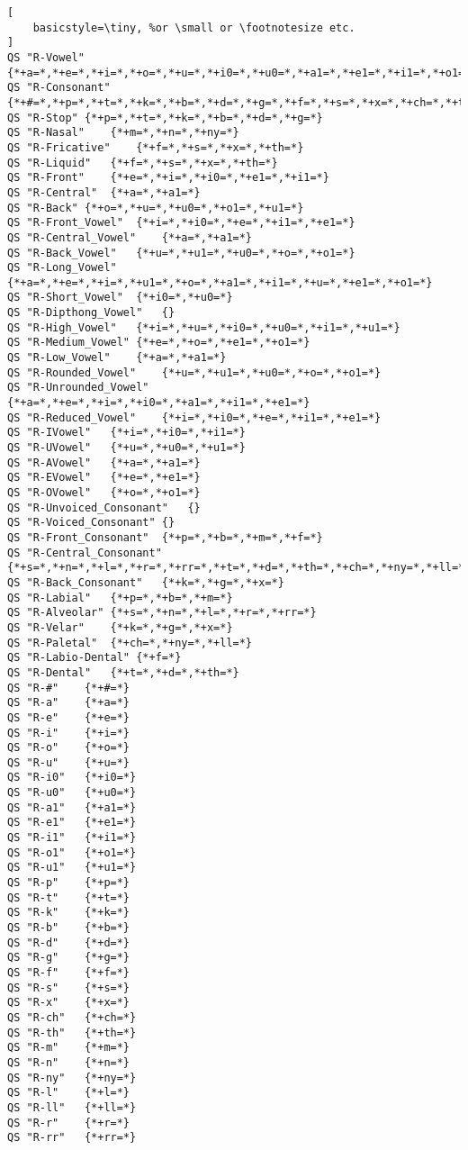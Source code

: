 \begin{lstlisting}[
    basicstyle=\tiny, %or \small or \footnotesize etc.
]
QS "R-Vowel"	{*+a=*,*+e=*,*+i=*,*+o=*,*+u=*,*+i0=*,*+u0=*,*+a1=*,*+e1=*,*+i1=*,*+o1=*,*+u1=*}
QS "R-Consonant"	{*+#=*,*+p=*,*+t=*,*+k=*,*+b=*,*+d=*,*+g=*,*+f=*,*+s=*,*+x=*,*+ch=*,*+th=*,*+m=*,*+n=*,*+ny=*,*+l=*,*+ll=*,*+r=*,*+rr=*}
QS "R-Stop"	{*+p=*,*+t=*,*+k=*,*+b=*,*+d=*,*+g=*}
QS "R-Nasal"	{*+m=*,*+n=*,*+ny=*}
QS "R-Fricative"	{*+f=*,*+s=*,*+x=*,*+th=*}
QS "R-Liquid"	{*+f=*,*+s=*,*+x=*,*+th=*}
QS "R-Front"	{*+e=*,*+i=*,*+i0=*,*+e1=*,*+i1=*}
QS "R-Central"	{*+a=*,*+a1=*}
QS "R-Back"	{*+o=*,*+u=*,*+u0=*,*+o1=*,*+u1=*}
QS "R-Front_Vowel"	{*+i=*,*+i0=*,*+e=*,*+i1=*,*+e1=*}
QS "R-Central_Vowel"	{*+a=*,*+a1=*}
QS "R-Back_Vowel"	{*+u=*,*+u1=*,*+u0=*,*+o=*,*+o1=*}
QS "R-Long_Vowel"	{*+a=*,*+e=*,*+i=*,*+u1=*,*+o=*,*+a1=*,*+i1=*,*+u=*,*+e1=*,*+o1=*}
QS "R-Short_Vowel"	{*+i0=*,*+u0=*}
QS "R-Dipthong_Vowel"	{}
QS "R-High_Vowel"	{*+i=*,*+u=*,*+i0=*,*+u0=*,*+i1=*,*+u1=*}
QS "R-Medium_Vowel"	{*+e=*,*+o=*,*+e1=*,*+o1=*}
QS "R-Low_Vowel"	{*+a=*,*+a1=*}
QS "R-Rounded_Vowel"	{*+u=*,*+u1=*,*+u0=*,*+o=*,*+o1=*}
QS "R-Unrounded_Vowel"	{*+a=*,*+e=*,*+i=*,*+i0=*,*+a1=*,*+i1=*,*+e1=*}
QS "R-Reduced_Vowel"	{*+i=*,*+i0=*,*+e=*,*+i1=*,*+e1=*}
QS "R-IVowel"	{*+i=*,*+i0=*,*+i1=*}
QS "R-UVowel"	{*+u=*,*+u0=*,*+u1=*}
QS "R-AVowel"	{*+a=*,*+a1=*}
QS "R-EVowel"	{*+e=*,*+e1=*}
QS "R-OVowel"	{*+o=*,*+o1=*}
QS "R-Unvoiced_Consonant"	{}
QS "R-Voiced_Consonant"	{}
QS "R-Front_Consonant"	{*+p=*,*+b=*,*+m=*,*+f=*}
QS "R-Central_Consonant"	{*+s=*,*+n=*,*+l=*,*+r=*,*+rr=*,*+t=*,*+d=*,*+th=*,*+ch=*,*+ny=*,*+ll=*}
QS "R-Back_Consonant"	{*+k=*,*+g=*,*+x=*}
QS "R-Labial"	{*+p=*,*+b=*,*+m=*}
QS "R-Alveolar"	{*+s=*,*+n=*,*+l=*,*+r=*,*+rr=*}
QS "R-Velar"	{*+k=*,*+g=*,*+x=*}
QS "R-Paletal"	{*+ch=*,*+ny=*,*+ll=*}
QS "R-Labio-Dental"	{*+f=*}
QS "R-Dental"	{*+t=*,*+d=*,*+th=*}
QS "R-#"	{*+#=*}
QS "R-a"	{*+a=*}
QS "R-e"	{*+e=*}
QS "R-i"	{*+i=*}
QS "R-o"	{*+o=*}
QS "R-u"	{*+u=*}
QS "R-i0"	{*+i0=*}
QS "R-u0"	{*+u0=*}
QS "R-a1"	{*+a1=*}
QS "R-e1"	{*+e1=*}
QS "R-i1"	{*+i1=*}
QS "R-o1"	{*+o1=*}
QS "R-u1"	{*+u1=*}
QS "R-p"	{*+p=*}
QS "R-t"	{*+t=*}
QS "R-k"	{*+k=*}
QS "R-b"	{*+b=*}
QS "R-d"	{*+d=*}
QS "R-g"	{*+g=*}
QS "R-f"	{*+f=*}
QS "R-s"	{*+s=*}
QS "R-x"	{*+x=*}
QS "R-ch"	{*+ch=*}
QS "R-th"	{*+th=*}
QS "R-m"	{*+m=*}
QS "R-n"	{*+n=*}
QS "R-ny"	{*+ny=*}
QS "R-l"	{*+l=*}
QS "R-ll"	{*+ll=*}
QS "R-r"	{*+r=*}
QS "R-rr"	{*+rr=*}


\end{lstlisting}
